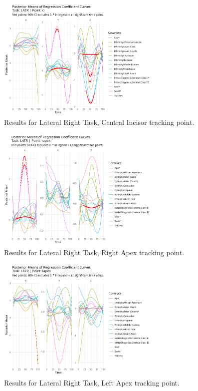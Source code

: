 \documentclass[AMA,Times1COL]{WileyNJDv5} %
\begin{document}
\begin{figure}[h]
    \centering
    \includegraphics[width = 0.7\textwidth]{latR_ci_plot.jpeg}
    \caption{Results for Lateral Right Task, Central Incisor tracking point.}
    \label{fig:latR_ci}
\end{figure}

\begin{figure}[h]
    \centering
    \includegraphics[width = 0.7\textwidth]{latR_rapex_plot.jpeg}
    \caption{Results for Lateral Right Task, Right Apex tracking point.}
    \label{fig:latR_rapex}
\end{figure}

\begin{figure}[h]
    \centering
    \includegraphics[width = 0.7\textwidth]{latR_lapex_plot.jpeg}
    \caption{Results for Lateral Right Task, Left Apex tracking point.}
    \label{fig:latR_lapex}
\end{figure}
\end{document}
